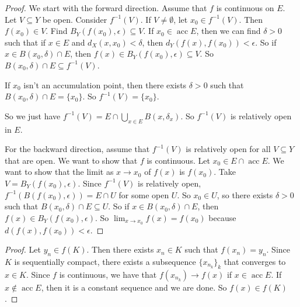 \documentclass{report}
\begin{document}

\begin{proof}
    We start with the forward direction. Assume that $f$ is continuous on $E$. Let $V \subseteq Y$ be open. Consider $f^{-1}(V)$. If $V \neq \emptyset$, let $x_0 \in f^{-1}(V)$. Then $f(x_0) \in V$. Find $B_Y(f(x_0), \epsilon) \subseteq V$. If $x_0 \in \operatorname{acc}E$, then we can find $\delta > 0$ such that if $x \in E$ and $d_X(x, x_0) < \delta$, then $d_Y(f(x), f(x_0)) < \epsilon$. So if $x \in B(x_0, \delta) \cap E$, then $f(x) \in B_Y(f(x_0), \epsilon) \subseteq V$. So $B(x_0, \delta) \cap E \subseteq f^{-1}(V)$.

    If $x_0$ isn't an accumulation point, then there exists $\delta > 0$ such that $B(x_0, \delta) \cap E = \{x_0\}$. So $f^{-1}(V) = \{x_0\}$. 
    
    So we just have $f^{-1}(V) = E \cap \bigcup_{x \in E} B(x, \delta_x)$. So $f^{-1}(V)$ is relatively open in $E$.

    For the backward direction, assume that $f^{-1}(V)$ is relatively open for all $V \subseteq Y$ that are open. We want to show that $f$ is continuous. Let $x_0 \in E \cap \operatorname{acc}E$. We want to show that the limit as $x \to x_0$ of $f(x)$ is $f(x_0)$. Take $V = B_Y(f(x_0), \epsilon)$. Since $f^{-1}(V)$ is relatively open, $f^{-1}(B(f(x_0), \epsilon)) = E \cap U$ for some open $U$. So $x_0 \in U$, so there exists $\delta > 0$ such that $B(x_0, \delta) \cap E \subseteq U$. So if $x \in B(x_0, \delta) \cap E$, then $f(x) \in B_Y(f(x_0), \epsilon)$. So $\lim_{x \to x_0} f(x) = f(x_0)$ because $d(f(x), f(x_0)) < \epsilon$.
\end{proof}
\newcommand{\acc}{\operatorname{acc}}

\begin{proof}
    Let $y_n \in f(K)$. Then there exists $x_n \in K$ such that $f(x_n) = y_n$. Since $K$ is sequentially compact, there exists a subsequence $\{x_{n_k}\}_k$ that converges to $x \in K$. Since $f$ is continuous, we have that $f(x_{n_k}) \to f(x)$ if $x \in \operatorname{acc}E$. If $x \notin \acc E$, then it is a constant sequence and we are done. So $f(x) \in f(K)$. 
\end{proof}
\end{document}
